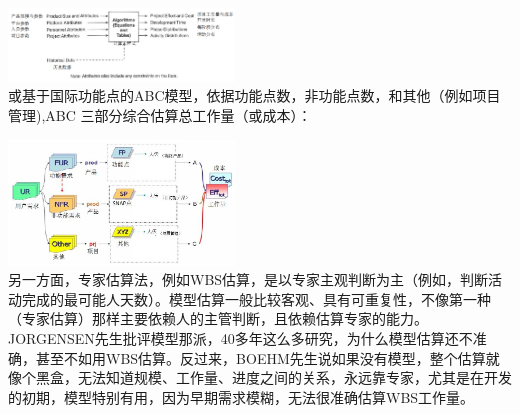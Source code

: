 
\includegraphics[width=6cm]{估算3.png}\\

或基于国际功能点的ABC模型，依据功能点数，非功能点数，和其他（例如项目管理),ABC
三部分综合估算总工作量（或成本）：


\includegraphics[width=6cm]{ABC模型.jpg}\\

另一方面，专家估算法，例如WBS估算，是以专家主观判断为主（例如，判断活动完成的最可能人天数）。模型估算一般比较客观、具有可重复性，不像第一种（专家估算）那样主要依赖人的主管判断，且依赖估算专家的能力。\\

JORGENSEN先生批评模型那派，40多年这么多研究，为什么模型估算还不准确，甚至不如用WBS估算。反过来，BOEHM先生说如果没有模型，整个估算就像个黑盒，无法知道规模、工作量、进度之间的关系，永远靠专家，尤其是在开发的初期，模型特别有用，因为早期需求模糊，无法很准确估算WBS工作量。\\



